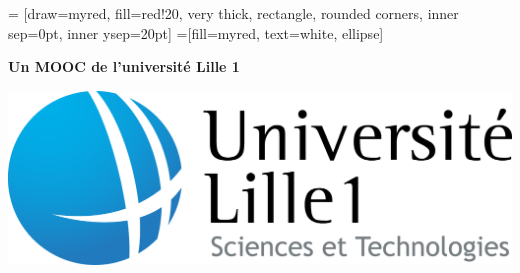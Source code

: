 










 = [draw=myred, fill=red!20, very thick,
    rectangle, rounded corners, inner sep=0pt, inner ysep=20pt]
 =[fill=myred, text=white, ellipse]

\centering

\begin{frame}



\vfill
\pause

\textbf{Un MOOC de l'université Lille 1}

\medskip

\includegraphics[scale=0.5]{Fig-crypto/logoLille1_transp.png} 

\medskip

\end{frame}


